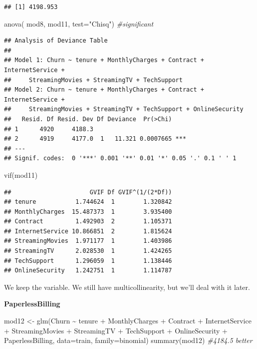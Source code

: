 \documentclass[
  twoside]{article}
\newenvironment{Shaded}{\begin{snugshade}}{\end{snugshade}}
\newcommand{\AttributeTok}[1]{\textcolor[rgb]{0.77,0.63,0.00}{#1}}
\newcommand{\CommentTok}[1]{\textcolor[rgb]{0.56,0.35,0.01}{\textit{#1}}}
\newcommand{\FunctionTok}[1]{\textcolor[rgb]{0.00,0.00,0.00}{#1}}
\newcommand{\NormalTok}[1]{#1}
\newcommand{\OtherTok}[1]{\textcolor[rgb]{0.56,0.35,0.01}{#1}}
\newcommand{\SpecialCharTok}[1]{\textcolor[rgb]{0.00,0.00,0.00}{#1}}
\newcommand{\StringTok}[1]{\textcolor[rgb]{0.31,0.60,0.02}{#1}}
\begin{document}
\begin{verbatim}
## [1] 4198.953
\end{verbatim}

\begin{Shaded}
\begin{Highlighting}[]
\FunctionTok{anova}\NormalTok{( mod8, mod11,  }\AttributeTok{test=}\StringTok{"Chisq"}\NormalTok{) }\CommentTok{\#significant}
\end{Highlighting}
\end{Shaded}

\begin{verbatim}
## Analysis of Deviance Table
## 
## Model 1: Churn ~ tenure + MonthlyCharges + Contract + InternetService + 
##     StreamingMovies + StreamingTV + TechSupport
## Model 2: Churn ~ tenure + MonthlyCharges + Contract + InternetService + 
##     StreamingMovies + StreamingTV + TechSupport + OnlineSecurity
##   Resid. Df Resid. Dev Df Deviance  Pr(>Chi)    
## 1      4920     4188.3                          
## 2      4919     4177.0  1   11.321 0.0007665 ***
## ---
## Signif. codes:  0 '***' 0.001 '**' 0.01 '*' 0.05 '.' 0.1 ' ' 1
\end{verbatim}

\begin{Shaded}
\begin{Highlighting}[]
\FunctionTok{vif}\NormalTok{(mod11)}
\end{Highlighting}
\end{Shaded}

\begin{verbatim}
##                      GVIF Df GVIF^(1/(2*Df))
## tenure           1.744624  1        1.320842
## MonthlyCharges  15.487373  1        3.935400
## Contract         1.492903  2        1.105371
## InternetService 10.866851  2        1.815624
## StreamingMovies  1.971177  1        1.403986
## StreamingTV      2.028530  1        1.424265
## TechSupport      1.296059  1        1.138446
## OnlineSecurity   1.242751  1        1.114787
\end{verbatim}

We keep the variable. We still have multicollinearity, but we'll deal
with it later.

\textbf{PaperlessBilling}

\begin{Shaded}
\begin{Highlighting}[]
\NormalTok{mod12 }\OtherTok{\textless{}{-}} \FunctionTok{glm}\NormalTok{(Churn }\SpecialCharTok{\textasciitilde{}}\NormalTok{ tenure }\SpecialCharTok{+}\NormalTok{ MonthlyCharges }\SpecialCharTok{+}\NormalTok{ Contract }\SpecialCharTok{+}\NormalTok{ InternetService }\SpecialCharTok{+} 
\NormalTok{               StreamingMovies }\SpecialCharTok{+}\NormalTok{ StreamingTV }\SpecialCharTok{+}\NormalTok{ TechSupport }\SpecialCharTok{+}\NormalTok{ OnlineSecurity }\SpecialCharTok{+}
\NormalTok{               PaperlessBilling, }\AttributeTok{data=}\NormalTok{train, }\AttributeTok{family=}\NormalTok{binomial)}
\FunctionTok{summary}\NormalTok{(mod12) }\CommentTok{\#4184.5 better}
\end{Highlighting}
\end{Shaded}
\end{document}
